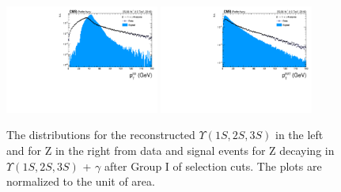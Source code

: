 \begin{figure}[!htbp]
\begin{center}
\includegraphics[width=0.45\textwidth]{figures_and_tables/outputPlots/ZtoUpsilon_Cat0_ZZZZZ/au/data_x_mc/noKinCuts/h_noKin_Upsilon_Pt}\hspace*{1.cm}
\includegraphics[width=0.45\textwidth]{figures_and_tables/outputPlots/ZtoUpsilon_Cat0_ZZZZZ/au/data_x_mc/noKinCuts/h_noKin_Z_Pt}
\end{center}\vspace*{-.5cm}
\caption{The \PT distributions for the reconstructed $\Upsilon(1S,2S,3S)$ in the left and for Z in the right from data and signal events for Z decaying in $\Upsilon(1S,2S,3S)$ + $\gamma$ after Group I of selection cuts. The plots are normalized to the unit of area.}
\label{fig:pTUpsilon_and_Z_ZtoUpsilon_Cat0}
\end{figure}


